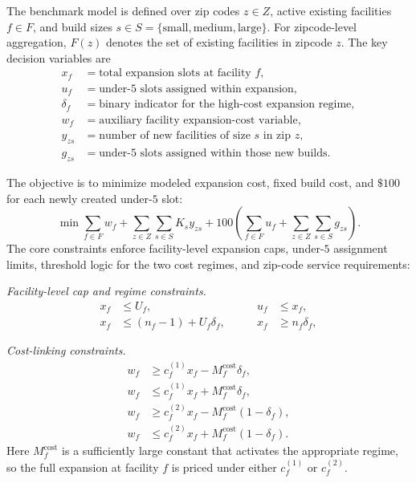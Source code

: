 \documentclass[11pt]{article}
\begin{document}
The benchmark model is defined over zip codes \(z \in Z\), active existing facilities \(f \in F\), and build sizes \(s \in S=\{\text{small},\text{medium},\text{large}\}\). For zipcode-level aggregation, \(F(z)\) denotes the set of existing facilities in zipcode \(z\). The key decision variables are
\[
\begin{aligned}
x_f &= \text{total expansion slots at facility } f,\\
u_f &= \text{under-\(5\) slots assigned within expansion},\\
\delta_f &= \text{binary indicator for the high-cost expansion regime},\\
w_f &= \text{auxiliary facility expansion-cost variable},\\
y_{zs} &= \text{number of new facilities of size } s \text{ in zip } z,\\
g_{zs} &= \text{under-\(5\) slots assigned within those new builds}.
\end{aligned}
\]

The objective is to minimize modeled expansion cost, fixed build cost, and \(\$100\) for each newly created under-\(5\) slot:
\[
\min \sum_{f \in F} w_f
 + \sum_{z \in Z}\sum_{s \in S} K_s y_{zs}
 + 100\left(\sum_{f \in F}u_f+\sum_{z \in Z}\sum_{s \in S}g_{zs}\right).
\]
The core constraints enforce facility-level expansion caps, under-\(5\) assignment limits, threshold logic for the two cost regimes, and zip-code service requirements:

\noindent\textit{Facility-level cap and regime constraints.}
\[
\begin{alignedat}{2}
x_f &\le U_f, &\qquad u_f &\le x_f,\\
x_f &\le (n_f-1)+U_f\delta_f, &\qquad x_f &\ge n_f\delta_f,
\end{alignedat}
\]

\noindent\textit{Cost-linking constraints.}
\[
\begin{aligned}
w_f &\ge c_f^{(1)}x_f - M_f^{\mathrm{cost}}\delta_f,\\
w_f &\le c_f^{(1)}x_f + M_f^{\mathrm{cost}}\delta_f,\\
w_f &\ge c_f^{(2)}x_f - M_f^{\mathrm{cost}}(1-\delta_f),\\
w_f &\le c_f^{(2)}x_f + M_f^{\mathrm{cost}}(1-\delta_f).
\end{aligned}
\]
Here \(M_f^{\mathrm{cost}}\) is a sufficiently large constant that activates the appropriate regime, so the full expansion at facility \(f\) is priced under either \(c_f^{(1)}\) or \(c_f^{(2)}\).
\end{document}
